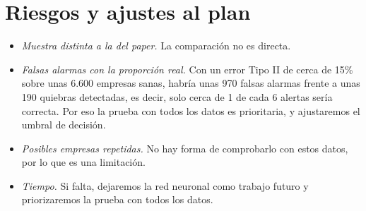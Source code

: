 \documentclass[11pt,a4paper]{article}
\begin{document}
\section{Riesgos y ajustes al plan}

\begin{itemize}[leftmargin=1.5em]
    \item \textit{Muestra distinta a la del paper.} La comparación no es directa.
    \item \textit{Falsas alarmas con la proporción real.} Con un error Tipo II de cerca de 15\% sobre unas 6.600 empresas sanas, habría unas 970 falsas alarmas frente a unas 190 quiebras detectadas, es decir, solo cerca de 1 de cada 6 alertas sería correcta. Por eso la prueba con todos los datos es prioritaria, y ajustaremos el umbral de decisión.
    \item \textit{Posibles empresas repetidas.} No hay forma de comprobarlo con estos datos, por lo que es una limitación.
    \item \textit{Tiempo.} Si falta, dejaremos la red neuronal como trabajo futuro y priorizaremos la prueba con todos los datos.
\end{itemize}

\nocite{liang2016,uci572}


\end{document}

